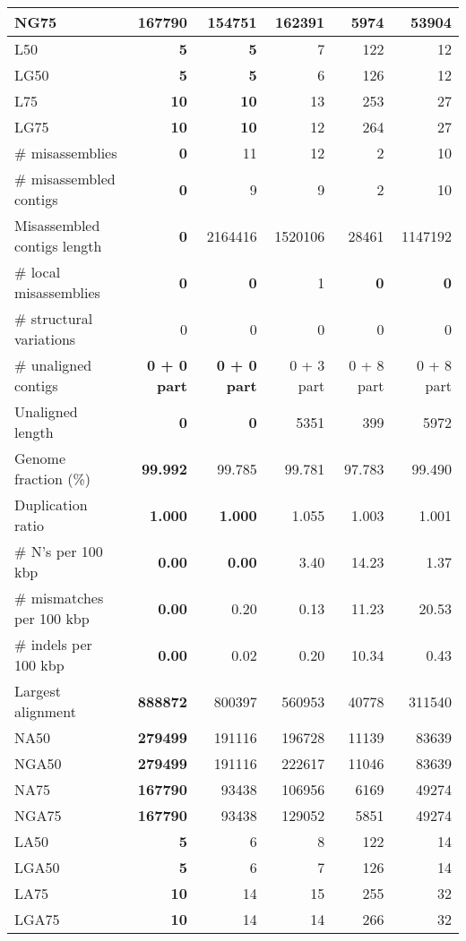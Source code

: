 \documentclass[12pt,a4paper]{article}
\begin{document}
\begin{table}[ht]
\begin{center}
\begin{tabular}{|l*{5}{|r}|}
NG75 & {\bf 167790} & 154751 & 162391 & 5974 & 53904 \\ \hline
L50 & {\bf 5} & {\bf 5} & 7 & 122 & 12 \\ \hline
LG50 & {\bf 5} & {\bf 5} & 6 & 126 & 12 \\ \hline
L75 & {\bf 10} & {\bf 10} & 13 & 253 & 27 \\ \hline
LG75 & {\bf 10} & {\bf 10} & 12 & 264 & 27 \\ \hline
\# misassemblies & {\bf 0} & 11 & 12 & 2 & 10 \\ \hline
\# misassembled contigs & {\bf 0} & 9 & 9 & 2 & 10 \\ \hline
Misassembled contigs length & {\bf 0} & 2164416 & 1520106 & 28461 & 1147192 \\ \hline
\# local misassemblies & {\bf 0} & {\bf 0} & 1 & {\bf 0} & {\bf 0} \\ \hline
\# structural variations & 0 & 0 & 0 & 0 & 0 \\ \hline
\# unaligned contigs & {\bf 0 + 0 part} & {\bf 0 + 0 part} & 0 + 3 part & 0 + 8 part & 0 + 8 part \\ \hline
Unaligned length & {\bf 0} & {\bf 0} & 5351 & 399 & 5972 \\ \hline
Genome fraction (\%) & {\bf 99.992} & 99.785 & 99.781 & 97.783 & 99.490 \\ \hline
Duplication ratio & {\bf 1.000} & {\bf 1.000} & 1.055 & 1.003 & 1.001 \\ \hline
\# N's per 100 kbp & {\bf 0.00} & {\bf 0.00} & 3.40 & 14.23 & 1.37 \\ \hline
\# mismatches per 100 kbp & {\bf 0.00} & 0.20 & 0.13 & 11.23 & 20.53 \\ \hline
\# indels per 100 kbp & {\bf 0.00} & 0.02 & 0.20 & 10.34 & 0.43 \\ \hline
Largest alignment & {\bf 888872} & 800397 & 560953 & 40778 & 311540 \\ \hline
NA50 & {\bf 279499} & 191116 & 196728 & 11139 & 83639 \\ \hline
NGA50 & {\bf 279499} & 191116 & 222617 & 11046 & 83639 \\ \hline
NA75 & {\bf 167790} & 93438 & 106956 & 6169 & 49274 \\ \hline
NGA75 & {\bf 167790} & 93438 & 129052 & 5851 & 49274 \\ \hline
LA50 & {\bf 5} & 6 & 8 & 122 & 14 \\ \hline
LGA50 & {\bf 5} & 6 & 7 & 126 & 14 \\ \hline
LA75 & {\bf 10} & 14 & 15 & 255 & 32 \\ \hline
LGA75 & {\bf 10} & 14 & 14 & 266 & 32 \\ \hline
\end{tabular}
\end{center}
\end{table}
\end{document}
